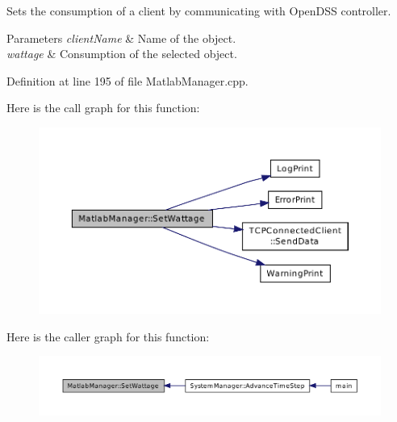 Sets the consumption of a client by communicating with Open\-D\-S\-S controller. 


\begin{DoxyParams}{Parameters}
{\em client\-Name} & Name of the object. \\
\hline
{\em wattage} & Consumption of the selected object. \\
\hline
\end{DoxyParams}


Definition at line 195 of file Matlab\-Manager.\-cpp.



Here is the call graph for this function\-:\nopagebreak
\begin{figure}[H]
\begin{center}
\leavevmode
\includegraphics[width=350pt]{class_matlab_manager_a2967a226a9c6a9ed22998cad67afed3c_cgraph}
\end{center}
\end{figure}




Here is the caller graph for this function\-:\nopagebreak
\begin{figure}[H]
\begin{center}
\leavevmode
\includegraphics[width=350pt]{class_matlab_manager_a2967a226a9c6a9ed22998cad67afed3c_icgraph}
\end{center}
\end{figure}




